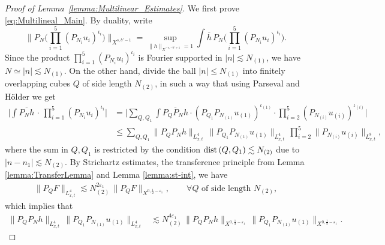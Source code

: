 \documentclass[10pt,a4paper]{amsart}
\newcommand{\dist} {\text{dist\! }}
\begin{document}
\begin{proof}[Proof of Lemma~\ref{lemma:Multilinear_Estimates}]
    We first prove \eqref{eq:Multilineal_Main}. By duality, write 
    \begin{equation}\label{eq:dual-norm}
        \bigg\lVert P_N \bigg(
        \prod_{i=1}^5 (P_{N_{i}} u_i)^{\iota_i} \bigg)
        \bigg\rVert_{X^{s, b'-1}} 
        = \sup_{\lVert h \rVert_{X^{-s, -b'+1}} = 1} 
        \int \overline{h} \, P_N \bigg( \prod_{i=1}^5 (P_{N_{i}} u_i)^{\iota_i} \bigg).
    \end{equation}  
    Since the product $\prod_{i=1}^5 (P_{N_{i}} u_i)^{\iota_i}$ is Fourier supported in $|n| \lesssim N_{(1)}$, 
    we have $N \simeq |n| \lesssim N_{(1)}$. 
    On the other hand,
    divide the ball $|n| \leq N_{(1)}$ into finitely overlapping cubes $Q$ of side length $N_{(2)}$,  
    in such a way that using Parseval and H\"older we get
    \begin{align}
        \Big| \int \overline{P_N h} \, \cdot \, \prod_{i=1}^5 (P_{N_i} u_i)^{\iota_i} \Big|
        & = \Big| \sum_{Q, Q_1} 
        \int \overline{P_Q P_N h} \cdot 
        (P_{Q_1}P_{N_{(1)}} u_{(1)})^{\iota_{(1)}}
        \cdot \prod_{i=2}^5 (P_{N_{(i)}} u_{(i)})^{\iota_{(i)}} \Big| \\
        & \leq 
        \sum_{Q, Q_1}
        \lVert P_Q P_N h \rVert_{L^4_{x,t}} \,
        \big\lVert  P_{Q_1} P_{N_{(1)}} u_{(1)} \big\rVert_{L^4_{x,t}} \, 
        \prod_{i=2}^5 \big\lVert  P_{N_{(i)}} u_{(i)} \big\rVert_{L^8_{x,t}},
    \end{align} 
    where the sum in $Q,Q_1$ is restricted by the condition $\dist(Q, Q_1) \lesssim N_{(2)}$ due to $|n-n_1| \lesssim N_{(2)}$. 
    By Strichartz estimates, the transference principle from Lemma \ref{lemma:TransferLemma}
    and Lemma \ref{lemma:st-int}, we have 
    \begin{align}\label{eq:Strichartz_Localized}
        \|P_Q F\|_{L^4_{x,t}}
        \lesssim 
        N_{(2)}^{2\varepsilon_1} \, \| P_Q F \|_{X^{0, \frac{1}{2} - \varepsilon_1}},
        \qquad \forall Q \text{ of side length } N_{(2)}, 
    \end{align}
    which implies that
    \begin{align}\label{eq:Multilinear_Proof_Xsb}
        \lVert  P_Q P_N  h \rVert_{L^4_{x,t}}\, 
        \big\lVert  P_{Q_1} P_{N_{(1)}} u_{(1)} \big\rVert_{L^4_{x,t}}
        & \lesssim 
        N_{(2)}^{4\varepsilon_1} \, 
        \lVert P_Q P_N  h \rVert_{X^{0, \frac{1}{2} - \varepsilon_1}} \, 
        \big\lVert  P_{Q_1} P_{N_{(1)}} u_{(1)} \big\rVert_{X^{0, \frac{1}{2} - \varepsilon_1}}. 

\end{align}
\end{proof}
\end{document}
